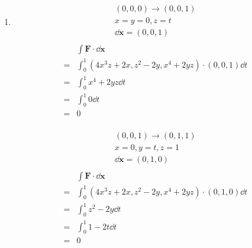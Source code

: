 \documentclass[10pt,\jkfside,a4paper]{article}
\begin{document}
\begin{enumerate}
\begin{enumerate}[label=(\roman*)]
\item 

\begin{equation*}
\begin{split}
(0, 0, 0) \longrightarrow (0, 0, 1) \\
x = y = 0, z = t \\
\dd{\mathbf{x}} = (0, 0, 1) \\
\end{split}
\end{equation*}
\begin{equation}
\begin{split}
 & \int \mathbf{F} \cdot \dd{\mathbf{x}} \\
=& \int^1_0 (4x^3z + 2x, z^2 - 2y, x^4 + 2yz) \cdot (0, 0, 1) \dd{t} \\
=& \int^1_0 x^4 + 2yz\dd{t} \\
=& \int^1_0 0\dd{t} \\
=& 0 \\
\end{split}
\end{equation}

\begin{equation*}
\begin{split}
(0, 0, 1) \longrightarrow (0, 1, 1) \\
x = 0, y = t, z = 1 \\
\dd{\mathbf{x}} = (0, 1, 0) \\
\end{split}
\end{equation*}
\begin{equation}
\begin{split}
 & \int \mathbf{F} \cdot \dd{\mathbf{x}} \\
=& \int^1_0 (4x^3z + 2x, z^2 - 2y, x^4 + 2yz) \cdot (0, 1, 0) \dd{t} \\
=& \int^1_0 z^2 - 2y \dd{t} \\
=& \int^1_0 1 - 2t \dd{t} \\
=& 0 \\
\end{split}
\end{equation}


\end{enumerate}
\end{enumerate}
\end{document}

